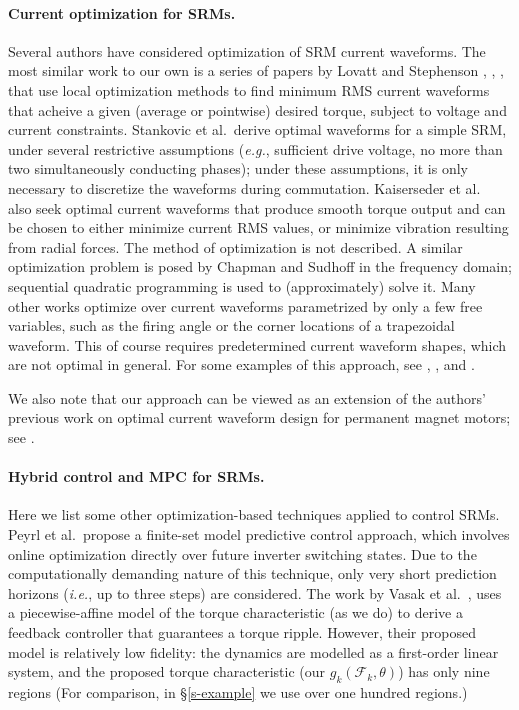 \documentclass[11pt]{article}
\newcommand{\eg}{{\it e.g.}}
\newcommand{\ie}{{\it i.e.}}
\begin{document}
\paragraph{Current optimization for SRMs.}
Several authors have considered optimization of SRM current waveforms.
The most similar work to our own is 
a series of papers by Lovatt and Stephenson 
\cite{lovatt1994computer},
\cite{lovatt1997computer},
\cite{lovatt1997optimum},
that use local optimization methods to find minimum RMS current waveforms
that acheive a given (average or pointwise) desired torque,
subject to voltage and current constraints.
Stankovic et al.\
derive optimal waveforms for a simple SRM,
under several restrictive assumptions
(\eg, sufficient drive voltage, 
no more than two simultaneously conducting phases);
under these assumptions, it is only necessary to discretize the
waveforms during commutation.
Kaiserseder et al.\ \cite{kaiserseder2003current}
also seek optimal current waveforms that produce smooth torque
output and can be chosen to either minimize current RMS values,
or minimize vibration resulting from radial forces.
The method of optimization is not described.
A similar optimization problem is posed by Chapman and Sudhoff 
\cite{chapman2002design}
in the frequency domain;
sequential quadratic programming is used to (approximately) solve it.
Many other works optimize over current waveforms parametrized by only
a few free variables, 
such as the firing angle or the corner locations of a trapezoidal waveform.
This of course requires predetermined current waveform shapes,
which are not optimal in general.
For some examples of this approach, see 
\cite{mademlis2003performance}, \cite{le1993current}, and \cite{choi2002new}.

We also note that our approach can be viewed as an extension
of the authors' previous work on optimal current waveform design
for permanent magnet motors; see \cite{moehle2015optimal}.




\paragraph{Hybrid control and MPC for SRMs.}
Here we list some other optimization-based techniques 
applied to control SRMs.
Peyrl et al.\ propose a finite-set model predictive control approach,
which involves online optimization directly over future inverter switching states.
Due to the computationally demanding nature of this technique,
only very short prediction horizons (\ie, up to three steps) are considered.
The work by Vasak et al.\ \cite{vasak2007bounding},
uses a piecewise-affine model of the torque characteristic 
(as we do)
to derive a feedback controller that guarantees a torque ripple.
However, their proposed model is relatively low fidelity:
the dynamics are modelled as a first-order linear system,
and the proposed torque characteristic 
(our $g_k(\mathcal F_k, \theta)$) has only nine regions
(For comparison, in \S\ref{s-example} we use over one hundred regions.)
\end{document}
